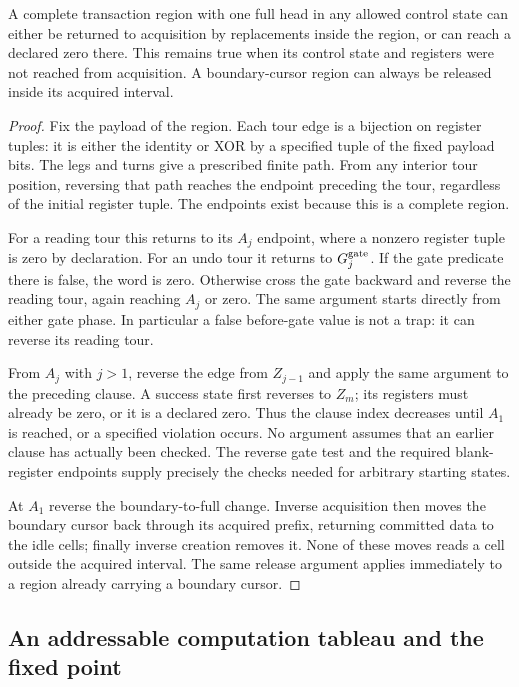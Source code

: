 \begin{lemma}\label{fr:rollback}
A complete transaction region with one full head in any allowed
control state can either be returned to acquisition by replacements
inside the region, or can reach a declared zero there.  This remains
true when its control state and registers were not reached from
acquisition.  A boundary-cursor region can always be released inside
its acquired interval.
\end{lemma}

\begin{proof}
Fix the payload of the region.  Each tour edge is a bijection on
register tuples: it is either the identity or XOR by a specified
tuple of the fixed payload bits.  The legs and turns give a
prescribed finite path.  From any interior tour position, reversing
that path reaches the endpoint preceding the tour, regardless of
the initial register tuple.  The endpoints exist because this is a
complete region.

For a reading tour this returns to its $A_j$ endpoint, where a
nonzero register tuple is zero by declaration.  For an undo tour it
returns to $G_j^{\rm gate}$.  If the gate predicate there is false,
the word is zero.  Otherwise cross the gate backward and reverse
the reading tour, again reaching $A_j$ or zero.  The same argument
starts directly from either gate phase.  In particular a false
before-gate value is not a trap: it can reverse its reading tour.

From $A_j$ with $j>1$, reverse the edge from $Z_{j-1}$ and apply the
same argument to the preceding clause.  A success state first
reverses to $Z_m$; its registers must already be zero, or it is a
declared zero.  Thus the clause index decreases until $A_1$ is
reached, or a specified violation occurs.  No argument assumes that
an earlier clause has actually been checked.  The reverse gate
test and the required blank-register endpoints supply precisely
the checks needed for arbitrary starting states.

At $A_1$ reverse the boundary-to-full change.  Inverse acquisition
then moves the boundary cursor back through its acquired prefix,
returning committed data to the idle cells; finally inverse
creation removes it.  None of these moves reads a cell outside the
acquired interval.  The same release argument applies immediately
to a region already carrying a boundary cursor.
\end{proof}

\subsection{An addressable computation tableau and the fixed point}
\label{fr:tableau}

